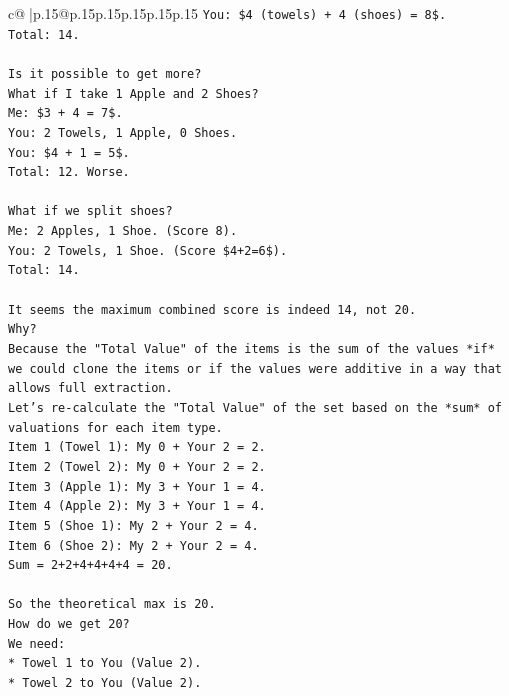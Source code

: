 \documentclass{article}
\begin{document}
{\begin{supertabular}{c@{$\;$}|p{.15\linewidth}@{}p{.15\linewidth}p{.15\linewidth}p{.15\linewidth}p{.15\linewidth}p{.15\linewidth}}
{{{\texttt{You: \$4 (towels) + 4 (shoes) = 8\$.} \\
\texttt{Total: 14.} \\
\\ 
\texttt{Is it possible to get more?} \\
\texttt{What if I take 1 Apple and 2 Shoes?} \\
\texttt{Me: \$3 + 4 = 7\$.} \\
\texttt{You: 2 Towels, 1 Apple, 0 Shoes.} \\
\texttt{You: \$4 + 1 = 5\$.} \\
\texttt{Total: 12. Worse.} \\
\\ 
\texttt{What if we split shoes?} \\
\texttt{Me: 2 Apples, 1 Shoe. (Score 8).} \\
\texttt{You: 2 Towels, 1 Shoe. (Score \$4+2=6\$).} \\
\texttt{Total: 14.} \\
\\ 
\texttt{It seems the maximum combined score is indeed 14, not 20.} \\
\texttt{Why?} \\
\texttt{Because the "Total Value" of the items is the sum of the values *if* we could clone the items or if the values were additive in a way that allows full extraction.} \\
\texttt{Let's re{-}calculate the "Total Value" of the set based on the *sum* of valuations for each item type.} \\
\texttt{Item 1 (Towel 1): My 0 + Your 2 = 2.} \\
\texttt{Item 2 (Towel 2): My 0 + Your 2 = 2.} \\
\texttt{Item 3 (Apple 1): My 3 + Your 1 = 4.} \\
\texttt{Item 4 (Apple 2): My 3 + Your 1 = 4.} \\
\texttt{Item 5 (Shoe 1): My 2 + Your 2 = 4.} \\
\texttt{Item 6 (Shoe 2): My 2 + Your 2 = 4.} \\
\texttt{Sum = 2+2+4+4+4+4 = 20.} \\
\\ 
\texttt{So the theoretical max is 20.} \\
\texttt{How do we get 20?} \\
\texttt{We need:} \\
\texttt{*   Towel 1 to You (Value 2).} \\
\texttt{*   Towel 2 to You (Value 2).} \\
}}}
\end{supertabular}}
\end{document}
